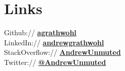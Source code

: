 \documentclass[letterpaper]{deedy-resume} %
\begin{document}
\begin{minipage}[t]{0.33\textwidth}
\sectionspace %


\section{Links} 

Github:// \href{https://github.com/agrathwohl}{\bf agrathwohl} \\
LinkedIn:// \href{https://www.linkedin.com/in/andrewgrathwohl}{\bf andrewgrathwohl} \\
StackOverflow:// \href{https://stackoverflow.com/users/5709024/andrewunmuted}{\bf AndrewUnmuted} \\
Twitter:// \href{https://twitter.com/AndrewUnmuted}{\bf @AndrewUnmuted} \\

\end{minipage} %
\hfill
%
%
\end{document}
